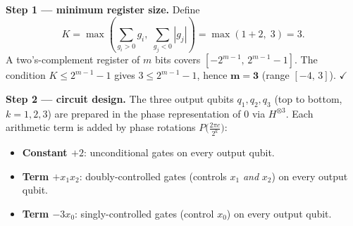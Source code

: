 \documentclass{ceri/sty/rapport}
\begin{document}
\begin{solution}
\textbf{Step 1 — minimum register size.}
Define
\[
  K = \max\!\left(\sum_{g_i > 0} g_i,\; \sum_{g_j < 0} |g_j|\right)
    = \max(1 + 2,\; 3) = 3.
\]
A two's-complement register of $m$ bits covers $[-2^{m-1},\, 2^{m-1}-1]$.
The condition $K \le 2^{m-1}-1$ gives $3 \le 2^{m-1}-1$, hence $\mathbf{m = 3}$
(range $[-4,\, 3]$). $\checkmark$

\medskip\noindent\textbf{Step 2 — circuit design.}
The three output qubits $q_1, q_2, q_3$ (top to bottom, $k = 1, 2, 3$) are
prepared in the phase representation of $0$ via $H^{\otimes 3}$.
Each arithmetic term is added by phase rotations $P\!\bigl(\tfrac{2\pi c}{2^k}\bigr)$:

\begin{itemize}
  \item \textbf{Constant $+2$}: unconditional gates on every output qubit.
  \item \textbf{Term $+x_1 x_2$}: doubly-controlled gates (controls $x_1$ \emph{and} $x_2$) on every output qubit.
  \item \textbf{Term $-3x_0$}: singly-controlled gates (control $x_0$) on every output qubit.
\end{itemize}


\end{solution}
\end{document}
